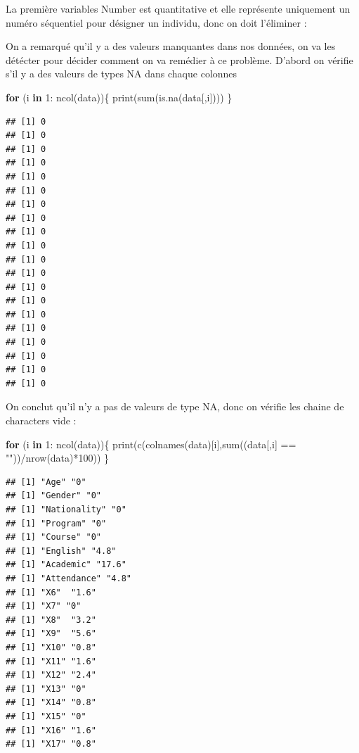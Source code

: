 \documentclass[
]{article}
\newenvironment{Shaded}{\begin{snugshade}}{\end{snugshade}}
\newcommand{\ConstantTok}[1]{\textcolor[rgb]{0.00,0.00,0.00}{#1}}
\newcommand{\ControlFlowTok}[1]{\textcolor[rgb]{0.13,0.29,0.53}{\textbf{#1}}}
\newcommand{\DecValTok}[1]{\textcolor[rgb]{0.00,0.00,0.81}{#1}}
\newcommand{\FunctionTok}[1]{\textcolor[rgb]{0.00,0.00,0.00}{#1}}
\newcommand{\NormalTok}[1]{#1}
\newcommand{\OtherTok}[1]{\textcolor[rgb]{0.56,0.35,0.01}{#1}}
\newcommand{\SpecialCharTok}[1]{\textcolor[rgb]{0.00,0.00,0.00}{#1}}
\newcommand{\StringTok}[1]{\textcolor[rgb]{0.31,0.60,0.02}{#1}}
\begin{document}
La première variables Number est quantitative et elle représente
uniquement un numéro séquentiel pour désigner un individu, donc on doit
l'éliminer :

\begin{Shaded}
\end{Shaded}

On a remarqué qu'il y a des valeurs manquantes dans nos données, on va
les détécter pour décider comment on va remédier à ce problème. D'abord
on vérifie s'il y a des valeurs de types NA dans chaque colonnes

\begin{Shaded}
\begin{Highlighting}[]
\ControlFlowTok{for}\NormalTok{ (i }\ControlFlowTok{in} \DecValTok{1}\SpecialCharTok{:} \FunctionTok{ncol}\NormalTok{(data))\{}
  \FunctionTok{print}\NormalTok{(}\FunctionTok{sum}\NormalTok{(}\FunctionTok{is.na}\NormalTok{(data[,i])))}
\NormalTok{\}}
\end{Highlighting}
\end{Shaded}

\begin{verbatim}
## [1] 0
## [1] 0
## [1] 0
## [1] 0
## [1] 0
## [1] 0
## [1] 0
## [1] 0
## [1] 0
## [1] 0
## [1] 0
## [1] 0
## [1] 0
## [1] 0
## [1] 0
## [1] 0
## [1] 0
## [1] 0
## [1] 0
## [1] 0
\end{verbatim}

On conclut qu'il n'y a pas de valeurs de type NA, donc on vérifie les
chaine de characters vide :

\begin{Shaded}
\begin{Highlighting}[]
\ControlFlowTok{for}\NormalTok{ (i }\ControlFlowTok{in} \DecValTok{1}\SpecialCharTok{:} \FunctionTok{ncol}\NormalTok{(data))\{}
  \FunctionTok{print}\NormalTok{(}\FunctionTok{c}\NormalTok{(}\FunctionTok{colnames}\NormalTok{(data)[i],}\FunctionTok{sum}\NormalTok{((data[,i] }\SpecialCharTok{==} \StringTok{""}\NormalTok{))}\SpecialCharTok{/}\FunctionTok{nrow}\NormalTok{(data)}\SpecialCharTok{*}\DecValTok{100}\NormalTok{))}
\NormalTok{\}}
\end{Highlighting}
\end{Shaded}

\begin{verbatim}
## [1] "Age" "0"  
## [1] "Gender" "0"     
## [1] "Nationality" "0"          
## [1] "Program" "0"      
## [1] "Course" "0"     
## [1] "English" "4.8"    
## [1] "Academic" "17.6"    
## [1] "Attendance" "4.8"       
## [1] "X6"  "1.6"
## [1] "X7" "0" 
## [1] "X8"  "3.2"
## [1] "X9"  "5.6"
## [1] "X10" "0.8"
## [1] "X11" "1.6"
## [1] "X12" "2.4"
## [1] "X13" "0"  
## [1] "X14" "0.8"
## [1] "X15" "0"  
## [1] "X16" "1.6"
## [1] "X17" "0.8"
\end{verbatim}
\end{document}
